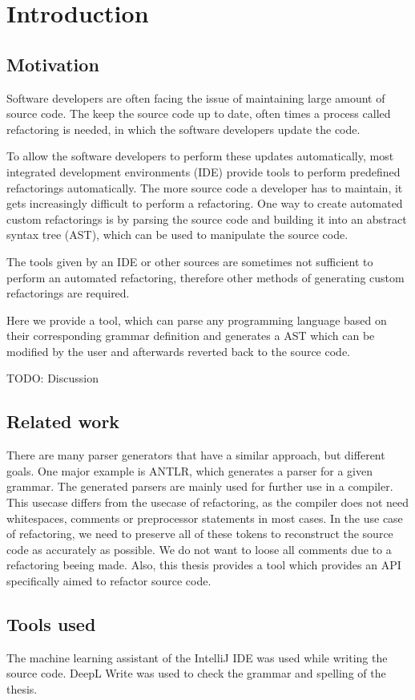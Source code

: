 \section{Introduction}

\subsection{Motivation}

Software developers are often facing the issue of maintaining large amount of source code. The keep the source code up to date, often times a process called refactoring is needed, in which the software developers update the code.

To allow the software developers to perform these updates automatically, most integrated development environments (IDE) provide tools to perform predefined refactorings automatically. The more source code a developer has to maintain, it gets increasingly difficult to perform a refactoring. One way to create automated custom refactorings is by parsing the source code and building it into an abstract syntax tree (AST), which can be used to manipulate the source code.

The tools given by an IDE or other sources are sometimes not sufficient to perform an automated refactoring, therefore other methods of generating custom refactorings are required. 

Here we provide a tool, which can parse any programming language based on their corresponding grammar definition and generates a AST which can be modified by the user and afterwards reverted back to the source code.


TODO: Discussion

\subsection{Related work}

There are many parser generators that have a similar approach, but different goals. One major example is ANTLR, which generates a parser for a given grammar. The generated parsers are mainly used for further use in a compiler. This usecase differs from the usecase of refactoring, as the compiler does not need whitespaces, comments or preprocessor statements in most cases. In the use case of refactoring, we need to preserve all of these tokens to reconstruct the source code as accurately as possible. We do not want to loose all comments due to a refactoring beeing made. Also, this thesis provides a tool which provides an API specifically aimed to refactor source code.

\subsection{Tools used}

The machine learning assistant of the IntelliJ IDE was used while writing the source code.
DeepL Write was used to check the grammar and spelling of the thesis.